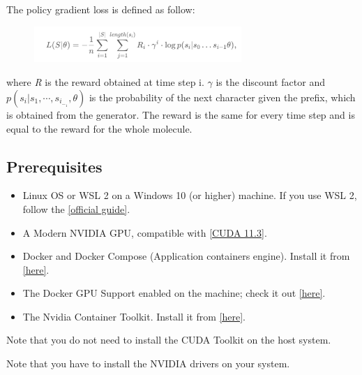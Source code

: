\documentclass[a4paper]{article}
\begin{document}
The policy gradient loss is defined as follow:

\begin{figure}[htbp]
		\centering
			\includegraphics[width=0.70\textwidth]{formula.png}
		\label{fig:formula}
	\end{figure}

where \textit{R} is the reward obtained at time step i. \begin{math}\gamma\end{math} is the discount factor and \begin{math} p(s_i | s_1,\cdots ,s_i_-_1,\theta) \end{math} is the probability of the next character given the prefix, which is obtained from the generator. The reward is the same for every time step and is equal to the reward for the whole molecule. 

\subsection{Prerequisites}\label{sec:Prerequisites}

\begin{itemize}
	\item Linux OS or WSL 2 on a Windows 10 (or higher) machine. If you use WSL 2, follow the \href{https://docs.nvidia.com/cuda/wsl-user-guide/index.html#getting-started-with-cuda-on-wsl}{[official guide]}.
	\item A Modern NVIDIA GPU, compatible with \href{https://developer.nvidia.com/cuda-11.3.0-download-archive}{[CUDA 11.3]}.
	\item Docker and Docker Compose (Application containers engine). Install it from \href{https://www.docker.com}{[here]}.
	\item The Docker GPU Support enabled on the machine; check it out \href{https://docs.docker.com/compose/gpu-support/}{[here]}.
	\item The Nvidia Container Toolkit. Install it from \href{https://docs.nvidia.com/datacenter/cloud-native/container-toolkit/install-guide.html#install-guide}{[here]}.
\end{itemize}

\begin{flushleft}
Note that you do not need to install the CUDA Toolkit on the host system.

Note that you have to install the NVIDIA drivers on your system.
\end{flushleft}
\end{document}
